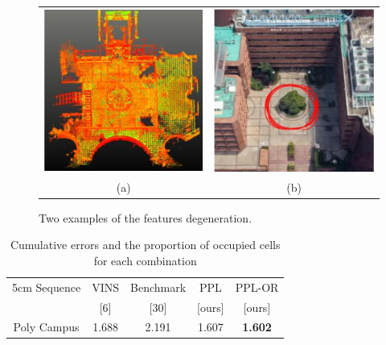 \documentclass[10pt, letterpaper]{article}
\begin{document}
\begin{multicols*}{2}
\begin{enumerate}
\begin{figure}[H]
    \centering
    \begin{tabular}{cc}{}
        \includegraphics[width=0.48\columnwidth]{images/a3.png}&
        \includegraphics[width=0.48\columnwidth]{images/b3.png}\\
         (a)  & (b) \\
         
    \end{tabular}
    \caption{Two examples of the features degeneration.}
    \label{fig:table_ab3}
\end{figure}

\begin{table}[H] %
    \centering
    \begin{tabular}{ccccc}{5cm}
    \hline
        Sequence & VINS  & Benchmark & PPL & PPL-OR\\
         & [6] & [30] & [ours] & [ours]\\
    \hline
     Poly Campus & 1.688 & 2.191 & 1.607 & \textbf{1.602} \\
    \hline
    \end{tabular}
    \caption{ Cumulative errors and the proportion of occupied cells for each combination}
    \label{tab:my_table}
\end{table}


\end{enumerate}
\end{multicols*}
\end{document}
